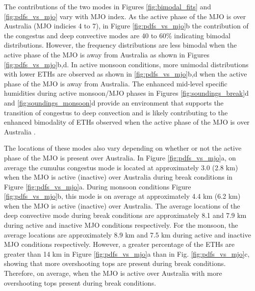 \documentclass[journal abbreviation, manuscript]{copernicus}
\begin{document}
    The contributions of the two modes in Figures \ref{fig:bimodal_fits} and \ref{fig:pdfs_vs_mjo} vary with MJO index. As the active phase of the MJO is over Australia (MJO indicies 4 to 7), in Figure \ref{fig:pdfs_vs_mjo}b the contribution of the congestus and deep convective modes are 40 to 60\% indicating bimodal distributions. However, the frequency distributions are less bimodal when the active phase of the MJO is away from Australia as shown in Figures \ref{fig:pdfs_vs_mjo}b,d. In active monsoon conditions, more unimodal distributions with lower ETHs are observed as shown in \ref{fig:pdfs_vs_mjo}b,d when the active phase of the MJO is away from Australia. The enhanced mid-level specific humidities during active monsoon/MJO phases in Figures \ref{fig:soundings_break}d and \ref{fig:soundings_monsoon}d provide an environment that supports the transition of congestus to deep convection and is likely contributing to the enhanced bimodality of ETHs observed when the active phase of the MJO is over Australia \citep{Hagosetal2013}. 

    The locations of these modes also vary depending on whether or not the active phase of the MJO is present over Australia. In Figure \ref{fig:pdfs_vs_mjo}a, on average the cumulus congestus mode is located at approximately 3.0 (2.8 km) when the MJO is active (inactive) over Australia during break conditions in Figure \ref{fig:pdfs_vs_mjo}a. During monsoon conditions Figure \ref{fig:pdfs_vs_mjo}b, this mode is on average at approximately 4.4 km (6.2 km) when the MJO is active (inactive) over Australia. The average locations of the deep convective mode during break conditions are approximately 8.1 and 7.9 km during active and inactive MJO conditions respectively. For the monsoon, the average locations are approximately 8.9 km and 7.5 km during active and inactive MJO conditions respectively. However, a greater percentage of the ETHs are greater than 14 km in Figure \ref{fig:pdfs_vs_mjo}a than in Fig. \ref{fig:pdfs_vs_mjo}c, showing that more overshooting tops are present during break conditions. Therefore, on average, when the MJO is active over Australia with more overshooting tops present during break conditions. 
    
\end{document}
